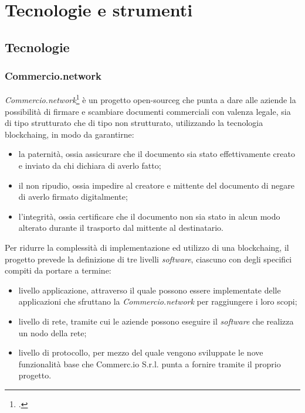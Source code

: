 
\chapter{Tecnologie e strumenti}
\label{cap:tecnologie-strumenti}

\section{Tecnologie}
\subsection{Commercio.network}

\textit{Commercio.network}\footcite{site:commercio-network} è un progetto \gls{open-sourceg} che punta a dare alle aziende la possibilità di firmare e scambiare documenti commerciali con valenza legale, sia di tipo strutturato che di tipo non strutturato, utilizzando la tecnologia \gls{blockchaing}, in modo da garantirne:

\begin{itemize}
	\item la paternità, ossia assicurare che il documento sia stato effettivamente creato e inviato da chi dichiara di averlo fatto;
	\item il non ripudio, ossia impedire al creatore e mittente del documento di negare di averlo firmato digitalmente;
	\item l'integrità, ossia certificare che il documento non sia stato in alcun modo alterato durante il trasporto dal mittente al destinatario.
\end{itemize}
Per ridurre la complessità di implementazione ed utilizzo di una \gls{blockchaing}, il progetto prevede la definizione di tre livelli \textit{software}, ciascuno con degli specifici compiti da portare a termine:

\begin{itemize}
	\item livello applicazione, attraverso il quale possono essere implementate delle applicazioni che sfruttano la \textit{Commercio.network} per raggiungere i loro scopi;
	\item livello di rete, tramite cui le aziende possono eseguire il \textit{software} che realizza un nodo della rete;
	\item livello di protocollo, per mezzo del quale vengono sviluppate le nove funzionalità base che Commerc.io S.r.l. punta a fornire tramite il proprio progetto.
\end{itemize}

